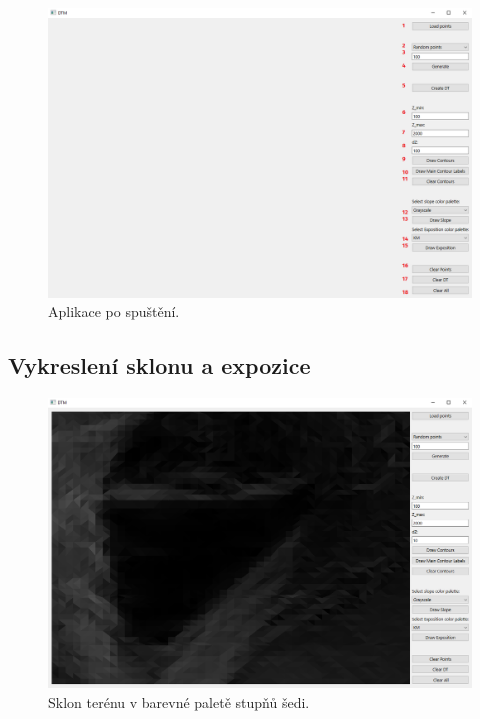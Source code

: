 \documentclass[a4paper, 12pt, oneside, titlepage]{article} %
\begin{document}
\begin{figure}[!htb]
	\centering
	\includegraphics[scale=0.45]{obrazky/zapnuti.png} 
	\caption{Aplikace po spuštění.
	}
	\label{fig:zapnuti}
\end{figure} 
\FloatBarrier

\subsection{Vykreslení sklonu a expozice}

\begin{figure}[!htb]
	\centering
	\includegraphics[scale=0.45]{obrazky/sklon_gs.png} 
	\caption{Sklon terénu v barevné paletě stupňů šedi.
	}
	\label{fig:sklon_gs}
\end{figure} 
\FloatBarrier
\end{document}
